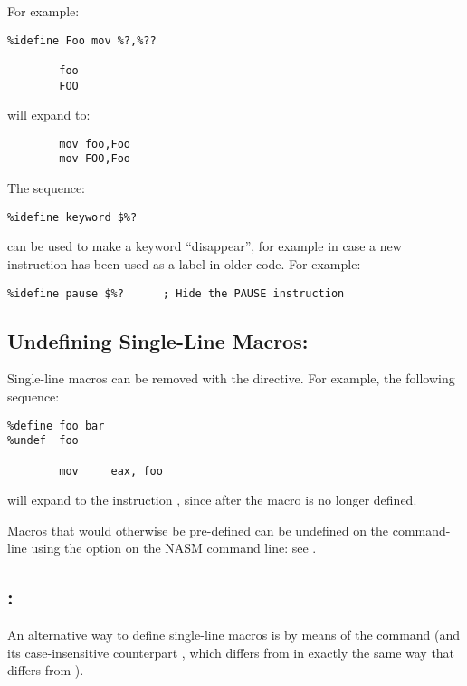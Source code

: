 For example:

\begin{lstlisting}
%idefine Foo mov %?,%??

        foo
        FOO
\end{lstlisting}

will expand to:

\begin{lstlisting}
        mov foo,Foo
        mov FOO,Foo
\end{lstlisting}

The sequence:

\begin{lstlisting}
%idefine keyword $%?
\end{lstlisting}

can be used to make a keyword ``disappear'', for example in case a new
instruction has been used as a label in older code.  For example:

\begin{lstlisting}
%idefine pause $%?		; Hide the PAUSE instruction
\end{lstlisting}

\subsection{Undefining Single-Line Macros: }
\label{subsec:undef}

Single-line macros can be removed with the  directive.
For example, the following sequence:

\begin{lstlisting}
%define foo bar
%undef  foo

        mov     eax, foo
\end{lstlisting}

will expand to the instruction , since after
 the macro  is no longer defined.

Macros that would otherwise be pre-defined can be undefined on the
command-line using the  option on the NASM command line:
see .

\subsection{: }
\label{subsec:assign}

An alternative way to define single-line macros is by means of the
 command (and its case-insensitive
counterpart , which differs from  in
exactly the same way that  differs from ).

